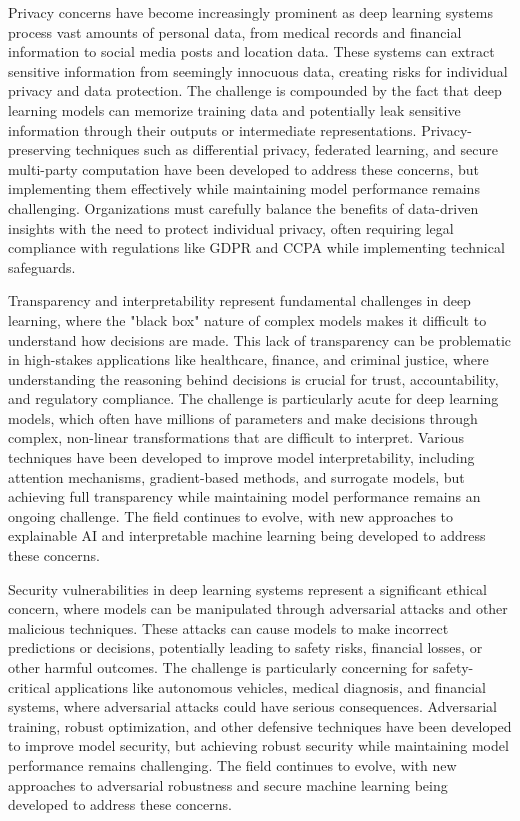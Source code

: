Privacy concerns have become increasingly prominent as deep learning systems process vast amounts of personal data, from medical records and financial information to social media posts and location data. These systems can extract sensitive information from seemingly innocuous data, creating risks for individual privacy and data protection. The challenge is compounded by the fact that deep learning models can memorize training data and potentially leak sensitive information through their outputs or intermediate representations. Privacy-preserving techniques such as differential privacy, federated learning, and secure multi-party computation have been developed to address these concerns, but implementing them effectively while maintaining model performance remains challenging. Organizations must carefully balance the benefits of data-driven insights with the need to protect individual privacy, often requiring legal compliance with regulations like GDPR and CCPA while implementing technical safeguards.

Transparency and interpretability represent fundamental challenges in deep learning, where the "black box" nature of complex models makes it difficult to understand how decisions are made. This lack of transparency can be problematic in high-stakes applications like healthcare, finance, and criminal justice, where understanding the reasoning behind decisions is crucial for trust, accountability, and regulatory compliance. The challenge is particularly acute for deep learning models, which often have millions of parameters and make decisions through complex, non-linear transformations that are difficult to interpret. Various techniques have been developed to improve model interpretability, including attention mechanisms, gradient-based methods, and surrogate models, but achieving full transparency while maintaining model performance remains an ongoing challenge. The field continues to evolve, with new approaches to explainable AI and interpretable machine learning being developed to address these concerns.

Security vulnerabilities in deep learning systems represent a significant ethical concern, where models can be manipulated through adversarial attacks and other malicious techniques. These attacks can cause models to make incorrect predictions or decisions, potentially leading to safety risks, financial losses, or other harmful outcomes. The challenge is particularly concerning for safety-critical applications like autonomous vehicles, medical diagnosis, and financial systems, where adversarial attacks could have serious consequences. Adversarial training, robust optimization, and other defensive techniques have been developed to improve model security, but achieving robust security while maintaining model performance remains challenging. The field continues to evolve, with new approaches to adversarial robustness and secure machine learning being developed to address these concerns.

